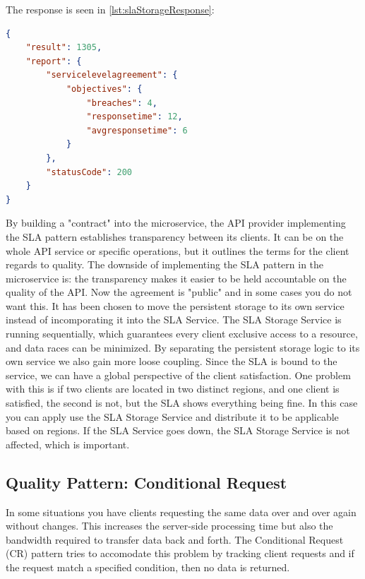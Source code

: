 \documentclass[12pt]{article}
\begin{document}
The response is seen in \ref{lst:slaStorageResponse}:

\begin{lstlisting}[caption=The response to the client when a calculation is requested, 
captionpos=b, language=json, label=slaStorageResponse]
{
    "result": 1305,
    "report": {
        "servicelevelagreement": {
            "objectives": {
                "breaches": 4,
                "responsetime": 12,
                "avgresponsetime": 6
            }
        },
        "statusCode": 200
    }
}
\end{lstlisting}

By building a "contract" into the microservice, the API provider implementing the SLA pattern establishes transparency between its clients. It can be on the whole API service or specific operations, but it outlines the terms for the client regards to quality. The downside of implementing the SLA pattern in the microservice is: the transparency makes it easier to be held accountable on the quality of the API. Now the agreement is "public" and in some cases you do not want this. It has been chosen to move the persistent storage to its own service instead of incomporating it into the SLA Service. The SLA Storage Service is running sequentially, which guarantees every client exclusive access to a resource, and data races can be minimized. By separating the persistent storage logic to its own service we also gain more loose coupling. Since the SLA is bound to the service, we can have a global perspective of the client satisfaction. One problem with this is if two clients are located in two distinct regions, and one client is satisfied, the second is not, but the SLA shows everything being fine. In this case you can apply use the SLA Storage Service and distribute it to be applicable based on regions. If the SLA Service goes down, the SLA Storage Service is not affected, which is important. 

\subsection{Quality Pattern: Conditional Request}
In some situations you have clients requesting the same data over and over again without changes. This increases the server-side processing time but also the bandwidth required to transfer data back and forth. The Conditional Request (CR) pattern tries to accomodate this problem by tracking client requests and if the request match a specified condition, then no data is returned. \\
\end{document}
